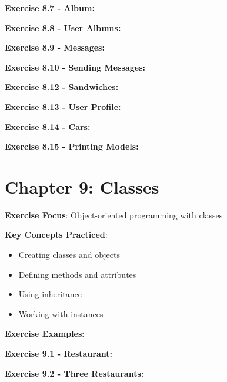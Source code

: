 \textbf{Exercise 8.7 - Album:}


\textbf{Exercise 8.8 - User Albums:}


\textbf{Exercise 8.9 - Messages:}


\textbf{Exercise 8.10 - Sending Messages:}


\textbf{Exercise 8.12 - Sandwiches:}


\textbf{Exercise 8.13 - User Profile:}


\textbf{Exercise 8.14 - Cars:}


\textbf{Exercise 8.15 - Printing Models:}


\section*{Chapter 9: Classes}
\textbf{Exercise Focus}: Object-oriented programming with classes

\textbf{Key Concepts Practiced}:
\begin{itemize}
    \item Creating classes and objects
    \item Defining methods and attributes
    \item Using inheritance
    \item Working with instances
\end{itemize}

\textbf{Exercise Examples}:

\textbf{Exercise 9.1 - Restaurant:}


\textbf{Exercise 9.2 - Three Restaurants:}


